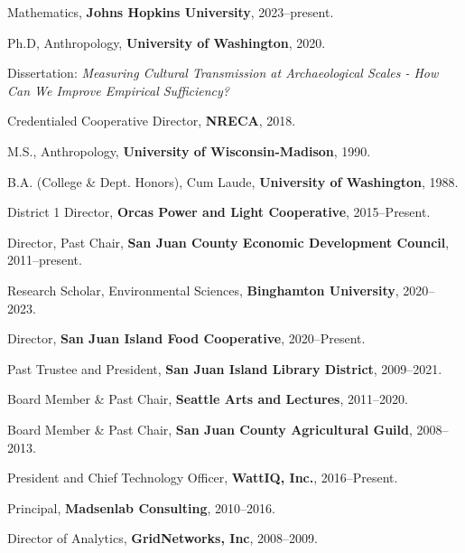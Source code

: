 \documentclass[11pt,article,oneside]{memoir}
\begin{document}
\bigskip 



\ind Mathematics, \textbf{Johns Hopkins University}, 2023--present.

\ind Ph.D, Anthropology, \textbf{University of Washington}, 2020.

\ind \hspace{0.35in} \footnotesize Dissertation: \emph{Measuring Cultural Transmission at Archaeological Scales - How Can We Improve Empirical Sufficiency?} \normalsize \vspace{0.02in}

\ind Credentialed Cooperative Director, \textbf{NRECA}, 2018.

\ind M.S., Anthropology, \textbf{University of Wisconsin-Madison}, 1990. \normalsize \vspace{0.01in}

\ind B.A. (College \& Dept. Honors), Cum Laude, \textbf{University of Washington}, 1988.

\bigskip


\ind District 1 Director, \textbf{Orcas Power and Light Cooperative}, 2015--Present.

\ind Director, Past Chair, \textbf{San Juan County Economic Development Council}, 2011--present.

\ind Research Scholar, Environmental Sciences, \textbf{Binghamton University}, 2020--2023.

\ind Director, \textbf{San Juan Island Food Cooperative}, 2020--Present.

\ind Past Trustee and President, \textbf{San Juan Island Library District}, 2009--2021.

\ind Board Member \& Past Chair, \textbf{Seattle Arts and Lectures}, 2011--2020.

\ind Board Member \& Past Chair, \textbf{San Juan County Agricultural Guild}, 2008--2013.

\bigskip

{}

\ind President and Chief Technology Officer, \textbf{WattIQ, Inc.}, 2016--Present.      

\ind Principal, \textbf{Madsenlab Consulting}, 2010--2016.

\ind Director of Analytics, \textbf{GridNetworks, Inc}, 2008--2009.
\end{document}
